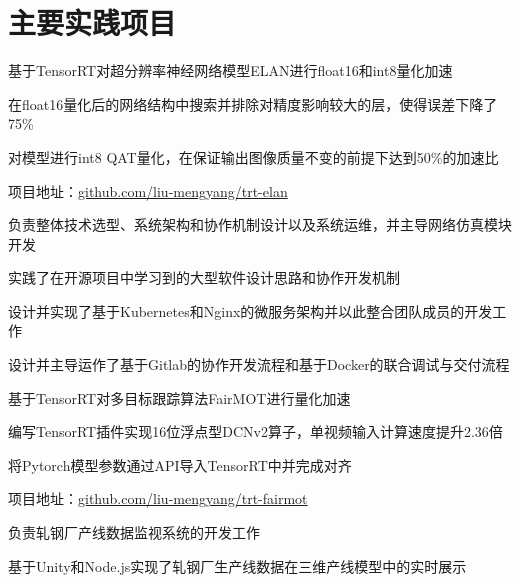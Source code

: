 \documentclass[]{deedy-resume-openfont}
\begin{document}
\begin{minipage}[t]{0.77\textwidth}
    \section{主要实践项目}
	\begin{tightemize}
		\item 基于TensorRT对超分辨率神经网络模型ELAN进行float16和int8量化加速
		\item 在float16量化后的网络结构中搜索并排除对精度影响较大的层，使得误差下降了75\%
		\item 对模型进行int8 QAT量化，在保证输出图像质量不变的前提下达到50\%的加速比
		\item 项目地址：\href{https://github.com/liu-mengyang/trt-elan}{github.com/liu-mengyang/trt-elan}
	\end{tightemize}
	\sectionsep

	\begin{tightemize}
		\item 负责整体技术选型、系统架构和协作机制设计以及系统运维，并主导网络仿真模块开发
		\item 实践了在开源项目中学习到的大型软件设计思路和协作开发机制
		\item 设计并实现了基于Kubernetes和Nginx的微服务架构并以此整合团队成员的开发工作
		\item 设计并主导运作了基于Gitlab的协作开发流程和基于Docker的联合调试与交付流程
	\end{tightemize}
	\sectionsep

	\begin{tightemize}
		\item 基于TensorRT对多目标跟踪算法FairMOT进行量化加速
		\item 编写TensorRT插件实现16位浮点型DCNv2算子，单视频输入计算速度提升2.36倍
		\item 将Pytorch模型参数通过API导入TensorRT中并完成对齐
		\item 项目地址：\href{https://github.com/liu-mengyang/trt-fairmot}{github.com/liu-mengyang/trt-fairmot}
	\end{tightemize}
	\sectionsep

	\begin{tightemize}
		\item 负责轧钢厂产线数据监视系统的开发工作
		\item 基于Unity和Node.js实现了轧钢厂生产线数据在三维产线模型中的实时展示
	\end{tightemize}
	\sectionsep


\end{minipage}
\end{document}
